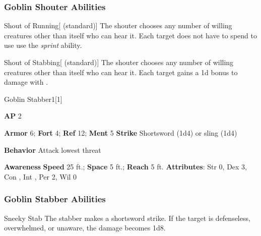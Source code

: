 \subsubsection{Goblin Shouter Abilities}

\begin{freeability}{Shout of Running}[ (standard)]
The shouter chooses any number of willing creatures other than itself who can hear it.
Each target does not have to spend  to use use the \textit{sprint} ability.
\end{freeability}

\vspace{0.5em}
\begin{freeability}{Shout of Stabbing}[ (standard)]
The shouter chooses any number of willing creatures other than itself who can hear it.
Each target gains a \plus1d bonus to damage with .
\end{freeability}

\begin{monsection}{Goblin Stabber}{1}[1]
\vspace{-1em}\vspace{-1em}
\begin{spellcontent}
\begin{spelltargetinginfo}
{\textbf{AP} 2}

\pari \textbf{Armor} 6;
\textbf{Fort} 4;
\textbf{Ref} 12;
\textbf{Ment} 5
\pari \textbf{Strike} Shortsword  (1d4) or sling  (1d4)



\pari \textbf{Behavior} Attack lowest threat
\end{spelltargetinginfo}
\end{spellcontent}

\begin{monsterfooter}
\pari \textbf{Awareness} 
\pari \textbf{Speed} 25 ft.;
\textbf{Space} 5 ft.;
\textbf{Reach} 5 ft.
\pari \textbf{Attributes}:
Str 0,
Dex 3,
Con ,
Int ,
Per 2,
Wil 0
\end{monsterfooter}
\end{monsection}


\subsubsection{Goblin Stabber Abilities}

\begin{freeability}{Sneeky Stab}
The stabber makes a shortsword strike.
If the target is defenseless, overwhelmed, or unaware, the damage becomes 1d8.
\end{freeability}


